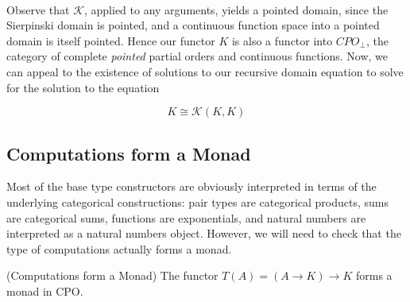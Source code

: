 \ \\\noindent Observe that $\mathcal{K}$, applied to any arguments,
yields a pointed domain, since the Sierpinski domain is pointed, and a
continuous function space into a pointed domain is itself
pointed. Hence our functor $K$ is also a functor into $CPO_\bot$, the
category of complete \emph{pointed} partial orders and continuous
functions. Now, we can appeal to the existence of solutions to our
recursive domain equation to solve for the solution to the equation 

\begin{displaymath}
K \cong \mathcal{K}(K, K)
\end{displaymath}

\subsection{Computations form a Monad}

Most of the base type constructors are obviously interpreted in terms
of the underlying categorical constructions: pair types are
categorical products, sums are categorical sums, functions are
exponentials, and natural numbers are interpreted as a natural numbers
object. However, we will need to check that the type of computations
actually forms a monad.

\begin{lemma}{(Computations form a Monad)} 
The functor $T(A) = (A \to K) \to K$ forms a monad in CPO. 
\end{lemma}

